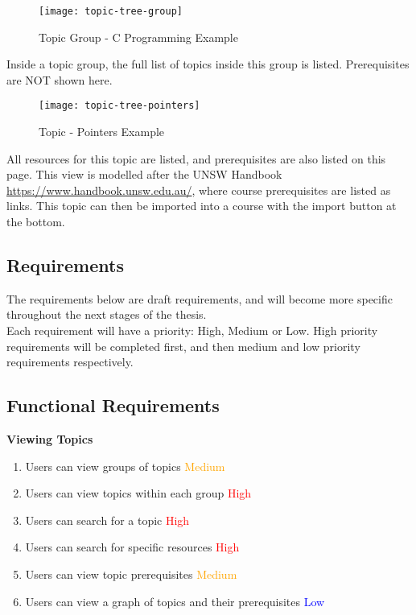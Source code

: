 \begin{figure}[h!]
    \centering
    \texttt{[image: topic-tree-group]}
    \caption{Topic Group - C Programming Example}
\end{figure}

Inside a topic group, the full list of topics inside this group is listed. Prerequisites are NOT shown here. \\

\begin{figure}[h!]
    \centering
    \texttt{[image: topic-tree-pointers]}
    \caption{Topic - Pointers Example}
\end{figure}

All resources for this topic are listed, and prerequisites are also listed on this page. This view is modelled after the UNSW Handbook \url{https://www.handbook.unsw.edu.au/}, where course prerequisites are listed as links. This topic can then be imported into a course with the import button at the bottom.\\

\subsection{Requirements}
The requirements below are draft requirements, and will become more specific throughout the next stages of the thesis.\\
Each requirement will have a priority: High, Medium or Low. High priority requirements will be completed first, and then medium and low priority requirements respectively. \\

\subsection{Functional Requirements}

\textbf{Viewing Topics}

    \begin{enumerate}
    \item Users can view groups of topics \textcolor{Orange}{Medium}
    \item Users can view topics within each group \textcolor{Red}{High}
    \item Users can search for a topic \textcolor{Red}{High}
    \item Users can search for specific resources \textcolor{Red}{High}
    \item Users can view topic prerequisites \textcolor{Orange}{Medium}
    \item Users can view a graph of topics and their prerequisites \textcolor{Blue}{Low}
    \end{enumerate}

